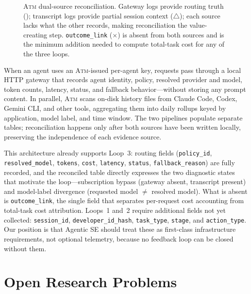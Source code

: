 \documentclass[sigconf,anonymous,review]{acmart}
\newcommand{\atm}{\textsc{Atm}\xspace}
\begin{document}
\begin{figure}[t]
\caption{\atm dual-source reconciliation. Gateway logs provide routing
  truth (\checkmark); transcript logs provide partial session context
  ($\triangle$); each source lacks what the other records, making
  reconciliation the value-creating step. \texttt{outcome\_link}
  ($\times$) is absent from both sources and is the minimum addition
  needed to compute total-task cost for any of the three loops.}
\label{fig:atm}
\end{figure}

When an agent uses an \atm-issued per-agent key, requests pass
through a local HTTP gateway that records agent identity, policy,
resolved provider and model, token counts, latency, status, and
fallback behavior---without storing any prompt content. In parallel,
\atm scans on-disk history files from Claude Code, Codex, Gemini
CLI, and other tools, aggregating them into daily rollups keyed by
application, model label, and time window. The two pipelines
populate separate tables; reconciliation happens only after both
sources have been written locally, preserving the independence of
each evidence source.

This architecture already supports Loop~3: routing fields
(\texttt{policy\_id}, \texttt{resolved\_model}, \texttt{tokens},
\texttt{cost}, \texttt{latency}, \texttt{status},
\texttt{fallback\_reason}) are fully recorded, and the reconciled
table directly expresses the two diagnostic states that motivate
the loop---subscription bypass (gateway absent, transcript present)
and model-label divergence (requested model $\neq$ resolved model).
What is absent is \texttt{outcome\_link}, the single field that
separates per-request cost accounting from total-task cost
attribution. Loops~1 and~2 require additional fields not yet
collected: \texttt{session\_id}, \texttt{developer\_id\_hash},
\texttt{task\_type}, \texttt{stage}, and \texttt{action\_type}.
Our position is that Agentic SE should treat these as first-class
infrastructure requirements, not optional telemetry, because no
feedback loop can be closed without them.

\section{Open Research Problems}
\label{sec:agenda}
\end{document}
